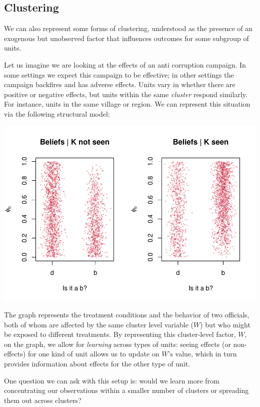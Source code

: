 \documentclass[
  12pt,
]{book}
\begin{document}
\hypertarget{clustering}{%
\subsection{Clustering}\label{clustering}}

We can also represent some forms of clustering, understood as the presence of an exogenous but unobserved factor that influences outcomes for some subgroup of units.

Let us imagine we are looking at the effects of an anti corruption campaign. In some settings we expect this campaign to be effective; in other settings the campaign backfires and has adverse effects. Units vary in whether there are positive or negative effects, but units within the same \emph{cluster} respond similarly. For instance, units in the same village or region. We can represent this situation via the following structural model:

\begin{center}\includegraphics{ii_files/figure-latex/unnamed-chunk-20-1} \end{center}

The graph represents the treatment conditions and the behavior of two officials, both of whom are affected by the same cluster level variable (\(W\)) but who might be exposed to different treatments. By representing this cluster-level factor, \(W\), on the graph, we allow for \emph{learning} across types of units: seeing effects (or non-effects) for one kind of unit allows us to update on \(W\)'s value, which in turn provides information about effects for the other type of unit.

One question we can ask with this setup is: would we learn more from concentrating our observations within a smaller number of clusters or spreading them out across clusters?
\end{document}
